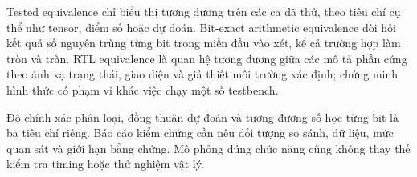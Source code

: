 Tested equivalence chỉ biểu thị tương đương trên các ca đã thử, theo tiêu chí cụ thể như tensor, điểm số hoặc dự đoán. Bit-exact arithmetic equivalence đòi hỏi kết quả số nguyên trùng từng bit trong miền đầu vào xét, kể cả trường hợp làm tròn và tràn. RTL equivalence là quan hệ tương đương giữa các mô tả phần cứng theo ánh xạ trạng thái, giao diện và giả thiết môi trường xác định; chứng minh hình thức có phạm vi khác việc chạy một số testbench.

Độ chính xác phân loại, đồng thuận dự đoán và tương đương số học từng bit là ba tiêu chí riêng. Báo cáo kiểm chứng cần nêu đối tượng so sánh, dữ liệu, mức quan sát và giới hạn bằng chứng. Mô phỏng đúng chức năng cũng không thay thế kiểm tra timing hoặc thử nghiệm vật lý.
